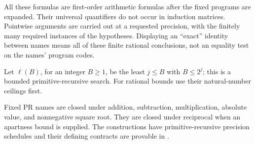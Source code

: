 All these formulas are first-order arithmetic formulas after the fixed programs are expanded. Their universal quantifiers do not occur in induction matrices. Pointwise arguments are carried out at a requested precision, with the finitely many required instances of the hypotheses. Displaying an ``exact'' identity between names means all of these finite rational conclusions, not an equality test on the names' program codes.

Let $\ell(B)$, for an integer $B\ge1$, be the least $j\le B$ with $B\le2^j$; this is a bounded primitive-recursive search. For rational bounds use their natural-number ceilings first.

\begin{theorem}\label{found:operations}
Fixed PR names are closed under addition, subtraction, multiplication, absolute value, and nonnegative square root. They are closed under reciprocal when an apartness bound is supplied. The constructions have primitive-recursive precision schedules and their defining contracts are provable in \ipra.
\end{theorem}
